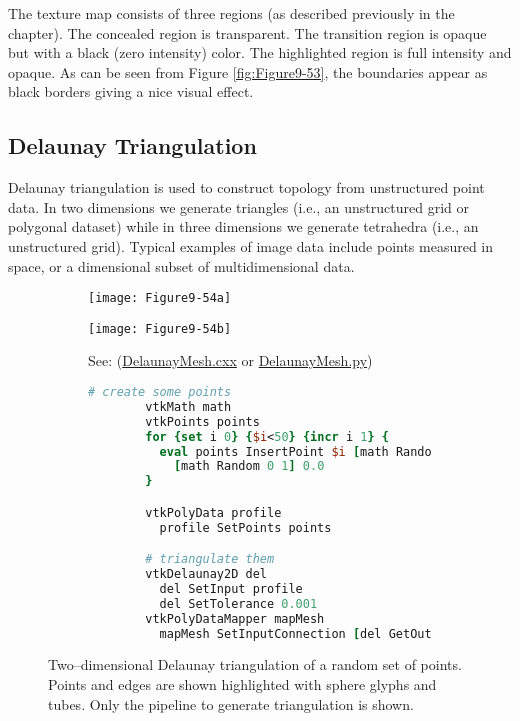 The texture map consists of three regions (as described previously in the chapter). The concealed region is transparent. The transition region is opaque but with a black (zero intensity) color. The highlighted region is full intensity and opaque. As can be seen from Figure \ref{fig:Figure9-53}, the boundaries appear as black borders giving a nice visual effect.

\subsection{Delaunay Triangulation}

Delaunay triangulation is used to construct topology from unstructured point data. In two dimensions we generate triangles (i.e., an unstructured grid or polygonal dataset) while in three dimensions we generate tetrahedra (i.e., an unstructured grid). Typical examples of image data include points measured in space, or a dimensional subset of multidimensional data.

\begin{figure}[htb]
    \centering
	\begin{subfigure}[h]{0.48\linewidth}
		\texttt{[image: Figure9-54a]}
		\captionsetup{justification=centering}
		\caption*{}
		\label{fig:Figure9-54a}
	\end{subfigure}
	\hfill
	\begin{subfigure}[h]{0.48\linewidth}
		\texttt{[image: Figure9-54b]}
		\captionsetup{justification=centering}
		\caption*{See: (\href{https://lorensen.github.io/VTKExamples/site/Cxx/Modelling/DelaunayMesh/}{DelaunayMesh.cxx} or \href{https://lorensen.github.io/VTKExamples/site/Python/Modelling/DelaunayMesh/}{DelaunayMesh.py})}
        \label{fig:Figure9-54b}
	\end{subfigure}
	\hfill
	\begin{subfigure}[h]{0.96\linewidth}
        \begin{lstlisting}[language=TCL,  caption={}, numbers=none, frame=none]
        # create some points
        vtkMath math
        vtkPoints points
        for {set i 0} {$i<50} {incr i 1} {
          eval points InsertPoint $i [math Random 0 1] \
            [math Random 0 1] 0.0
        }

        vtkPolyData profile
          profile SetPoints points

        # triangulate them
        vtkDelaunay2D del
          del SetInput profile
          del SetTolerance 0.001
        vtkPolyDataMapper mapMesh
          mapMesh SetInputConnection [del GetOutputPort]
        \end{lstlisting}
        \label{fig:Figure9-54d}
	\end{subfigure}
	\caption{Two--dimensional Delaunay triangulation of a random set of points. Points and edges are shown highlighted with sphere glyphs and tubes. Only the pipeline to generate triangulation is shown.}\label{fig:Figure9-54}
\end{figure}

